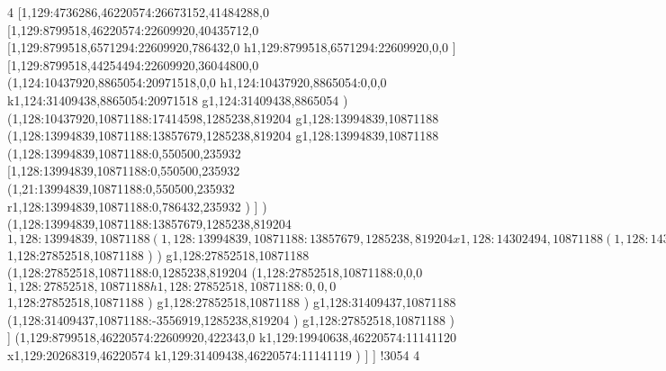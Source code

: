 {4
[1,129:4736286,46220574:26673152,41484288,0
[1,129:8799518,46220574:22609920,40435712,0
[1,129:8799518,6571294:22609920,786432,0
h1,129:8799518,6571294:22609920,0,0
]
[1,129:8799518,44254494:22609920,36044800,0
(1,124:10437920,8865054:20971518,0,0
h1,124:10437920,8865054:0,0,0
k1,124:31409438,8865054:20971518
g1,124:31409438,8865054
)
(1,128:10437920,10871188:17414598,1285238,819204
g1,128:13994839,10871188
(1,128:13994839,10871188:13857679,1285238,819204
g1,128:13994839,10871188
(1,128:13994839,10871188:0,550500,235932
[1,128:13994839,10871188:0,550500,235932
(1,21:13994839,10871188:0,550500,235932
r1,128:13994839,10871188:0,786432,235932
)
]
)
(1,128:13994839,10871188:13857679,1285238,819204
$1,128:13994839,10871188
(1,128:13994839,10871188:13857679,1285238,819204
x1,128:14302494,10871188
(1,128:14320699,10600595:356734,197518,0
x1,128:14644665,10600595
)
x1,128:15423817,10871188
g1,128:15605857,10871188
x1,128:16115583,10871188
g1,128:16297623,10871188
x1,128:16605278,10871188
(1,128:16623483,10600595:356734,197518,0
x1,128:16947449,10600595
)
g1,128:17125849,10871188
x1,128:17635575,10871188
g1,128:17781207,10871188
[1,128:17781207,10871188:1552241,1285238,819204
(1,128:17781207,9995550:1552241,344064,114688
x1,128:19333448,9995550
)
(1,128:17781207,10871188:1552241,688132,360452
k1,128:18084011,10871188:302804
(1,128:18084011,10248592:946633,65536,983048
x1,128:19030644,10248592
)
k1,128:19333448,10871188:302804
)
(1,128:17781207,11624856:1552241,197518,0
k1,128:17961659,11624856:180452
x1,128:19152996,11624856
k1,128:19333448,11624856:180452
)
]
g1,128:19442672,10871188
x1,128:19708685,10871188
(1,128:19708685,10600595:497819,197518,0
x1,128:20173736,10600595
)
g1,128:20315728,10871188
(1,128:20315728,10871188:7536790,491520,163840
(1,128:20315728,10871188:182045,491520,163840
x1,128:20497773,10871188
)
x1,128:20810359,10871188
x1,128:21396390,10871188
(1,128:21414595,10600595:497819,197518,0
x1,128:21879646,10600595
)
x1,128:22167277,10871188
g1,128:22312909,10871188
x1,128:22822635,10871188
g1,128:22968267,10871188
x1,128:23604058,10871188
(1,128:23675509,10600595:497819,197518,0
x1,128:24140560,10600595
)
g1,128:24318960,10871188
x1,128:24828686,10871188
g1,128:24974318,10871188
x1,128:25421693,10871188
(1,128:25468569,10600595:497819,197518,0
x1,128:25933620,10600595
)
g1,128:26112020,10871188
x1,128:26621746,10871188
g1,128:26767378,10871188
x1,128:27138066,10871188
(1,128:27172654,10600595:497819,197518,0
x1,128:27637705,10600595
)
(1,128:27670473,10871188:182045,491520,163840
x1,128:27852518,10871188
)
)
)
$1,128:27852518,10871188
)
)
g1,128:27852518,10871188
(1,128:27852518,10871188:0,1285238,819204
(1,128:27852518,10871188:0,0,0
$1,128:27852518,10871188
h1,128:27852518,10871188:0,0,0
$1,128:27852518,10871188
)
g1,128:27852518,10871188
)
g1,128:31409437,10871188
(1,128:31409437,10871188:-3556919,1285238,819204
)
g1,128:27852518,10871188
)
]
(1,129:8799518,46220574:22609920,422343,0
k1,129:19940638,46220574:11141120
x1,129:20268319,46220574
k1,129:31409438,46220574:11141119
)
]
]
!3054
}4
